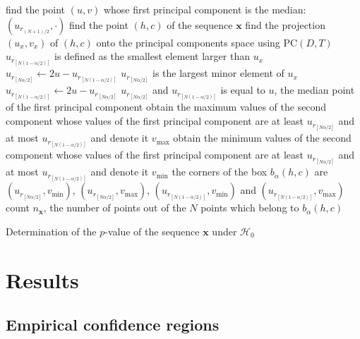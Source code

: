 \documentclass[alpha-refs]{wiley-article}
\begin{document}
\begin{algorithm}[hbt]
	find the point $(u,v)$ whose first principal component is the median: $(u_{r_{(N+1)/2}}, \cdot)$\;
	find the point $(h,c)$ of the sequence $\bm x$\;
	find the projection $(u_x,v_x)$ of $(h,c)$ onto the principal components space using $\text{PC}(D,T)$\;	
	{ $u_{r_{[N(1-\alpha/2)]}}$ is defined as the smallest element larger than $u_x$\;
		$u_{r_{[N\alpha/2]}} \leftarrow 2u - u_{r_{[N(1-\alpha/2)]}}$\;
	}
	{
		{ $u_{r_{[N\alpha/2]}}$ is the largest minor element of $u_x$\;
			$u_{r_{[N(1-\alpha/2)]}} \leftarrow 2u - u_{r_{[N\alpha/2]}}$\;
		}
		{ $u_{r_{[N\alpha/2]}}$ and $u_{r_{[N(1-\alpha/2)]}}$ is equal to $u$, the median point of the first principal component\; 
		}
	}
	obtain the maximum values of the second component whose values of the first principal component are at least $u_{r_{[N\alpha/2]}}$ and at most $u_{r_{[N(1-\alpha/2)]}}$ and denote it $v_{\max}$\;
	obtain the minimum values of the second component whose values of the first principal component are at least $u_{r_{[N\alpha/2]}}$ and at most $u_{r_{[N(1-\alpha/2)]}}$ and denote it $v_{\min}$\;
	the corners of the box $b_{\alpha}(h,c)$ are 
	$(u_{r_{[N\alpha/2]}}, v_{\min})$, 
	$(u_{r_{[N\alpha/2]}}, v_{\max})$, 
	$(u_{r_{[N(1-\alpha/2)]}}, v_{\min})$ and 
	$(u_{r_{[N(1-\alpha/2)]}}, v_{\max})$\;
	count $n_{\bm x}$, the number of points out of the $N$ points which belong to $b_{\alpha}(h,c)$\;
	\caption{Determination of the $p$-value of the sequence $\bm x$ under $\mathcal H_0$}\label{Algo:p-value}
\end{algorithm}

\section{Results}\label{Sec:Results}

\subsection{Empirical confidence regions}
\end{document}
